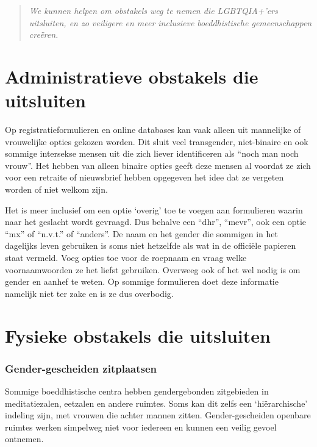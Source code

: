 \documentclass[12pt,openany]{book}
\begin{document}
\begin{quote}
\textit{We kunnen helpen om obstakels weg te nemen die \mbox{LGBTQIA+’ers} uitsluiten, en zo veiligere en meer inclusieve boeddhistische gemeenschappen creëren.}
\end{quote}

\section*{Administratieve obstakels die uitsluiten}

Op registratieformulieren en online databases kan vaak alleen uit mannelijke of vrouwelijke opties gekozen worden.  Dit sluit veel transgender, niet-binaire en ook sommige intersekse mensen uit die zich liever identificeren als “noch man noch vrouw”. Het hebben van alleen binaire opties geeft deze mensen al voordat ze zich voor een retraite of nieuwsbrief hebben opgegeven het idee dat ze vergeten worden of niet welkom zijn.

Het is meer inclusief om een optie ‘overig’ toe te voegen aan formulieren waarin naar het geslacht wordt gevraagd. Dus behalve een “dhr”, “mevr”, ook een optie “mx” of “n.v.t.” of “anders”. De naam en het gender die sommigen in het dagelijks leven gebruiken is soms niet hetzelfde als wat in de officiële papieren staat vermeld. Voeg opties toe voor de roepnaam en vraag welke voornaamwoorden ze het liefst gebruiken. Overweeg ook of het wel nodig is om gender en aanhef te weten. Op sommige formulieren doet deze informatie namelijk niet ter zake en is ze dus overbodig.

\section*{Fysieke obstakels die uitsluiten}

\subsubsection*{Gender-gescheiden zitplaatsen}

Sommige boeddhistische centra hebben gendergebonden zitgebieden in meditatiezalen, eetzalen en andere ruimtes. Soms kan dit zelfs een ‘hiërarchische’ indeling zijn, met vrouwen die achter mannen zitten. Gender-gescheiden openbare ruimtes werken simpelweg niet voor iedereen en kunnen een veilig gevoel ontnemen. 
\end{document}
